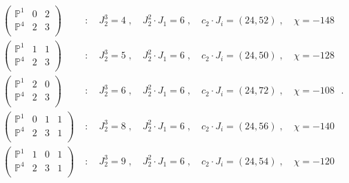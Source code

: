 \documentclass[11pt,a4paper]{article}
\numberwithin{equation}{section}
\numberwithin{table}{section}\setlength{\multlinegap}{25pt}
\begin{document}
\begin{equation}
    \begin{aligned}
        \left(
        \begin{array}{c|cc}
            \mathbb{P}^1 & 0 & 2\\
            \mathbb{P}^4 & 2 & 3\\
        \end{array}
        \right)\;&:\quad
        J_2^3=4\;,\quad J_2^2\cdot J_1=6\;,\quad
        c_2\cdot J_i=(24,52)\;,\quad
        \chi=-148
        \\
        \left(
        \begin{array}{c|cc}
            \mathbb{P}^1 & 1 & 1\\
            \mathbb{P}^4 & 2 & 3\\
        \end{array}
        \right)\;&:\quad
        J_2^3=5\;,\quad J_2^2\cdot J_1=6\;,\quad
        c_2\cdot J_i=(24,50)\;,\quad
        \chi=-128
        \\
        \left(
        \begin{array}{c|cc}
            \mathbb{P}^1 & 2 & 0\\
            \mathbb{P}^4 & 2 & 3\\
        \end{array}
        \right)\;&:\quad
        J_2^3=6\;,\quad J_2^2\cdot J_1=6\;,\quad
        c_2\cdot J_i=(24,72)\;,\quad
        \chi=-108
        \\
        \left(
        \begin{array}{c|ccc}
            \mathbb{P}^1 & 0 & 1 & 1\\
            \mathbb{P}^4 & 2 & 3 & 1\\
        \end{array}
        \right)\;&:\quad
        J_2^3=8\;,\quad J_2^2\cdot J_1=6\;,\quad
        c_2\cdot J_i=(24,56)\;,\quad
        \chi=-140
        \\
        \left(
        \begin{array}{c|ccc}
            \mathbb{P}^1 & 1 & 0 & 1\\
            \mathbb{P}^4 & 2 & 3 & 1\\
        \end{array}
        \right)\;&:\quad
        J_2^3=9\;,\quad J_2^2\cdot J_1=6\;,\quad
        c_2\cdot J_i=(24,54)\;,\quad
        \chi=-120
        \end{aligned}\;.
\end{equation}
\end{document}
